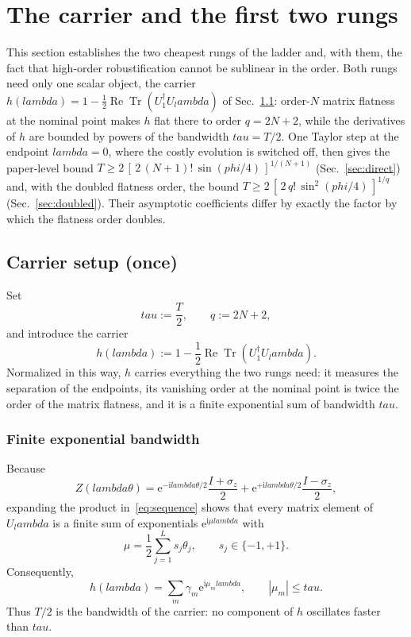 \documentclass[%
  aps,
  pra,
  preprint,
  superscriptaddress,
  amsmath,amssymb,
  nofootinbib,
  floatfix,
]{revtex4-2}
\def\lambda{lambda}\def\tau{tau}\def\phi{phi}\def\alpha{alpha}%
\theoremstyle{definition}
\theoremstyle{remark}
\newcommand{\Tr}{\operatorname{Tr}}
\newcommand{\Ree}{\operatorname{Re}}
\newcommand{\tauvar}{\tau}
\begin{document}
\section{The carrier and the first two rungs}
\label{sec:elementary}

This section establishes the two cheapest rungs of the ladder and, with them, the fact that
high-order robustification cannot be sublinear in the order. Both rungs need only one scalar
object, the carrier $h(\lambda)=1-\tfrac12\Ree\Tr(U_1^\dagger U_\lambda)$ of
Sec.~\ref{sec:carrier}: order-$N$ matrix flatness at the nominal point makes $h$ flat there to
order $q=2N+2$, while the derivatives of $h$ are bounded by powers of the bandwidth
$\tauvar=T/2$. One Taylor step at the endpoint $\lambda=0$, where the costly evolution is
switched off, then gives the paper-level bound
$T\ge2\,[\,2\,(N+1)!\,\sin(\phi/4)\,]^{1/(N+1)}$ (Sec.~\ref{sec:direct}) and, with the
doubled flatness order, the bound $T\ge2\,[\,2\,q!\,\sin^{2}(\phi/4)\,]^{1/q}$
(Sec.~\ref{sec:doubled}). Their asymptotic coefficients differ by exactly the factor by which
the flatness order doubles.

\subsection{Carrier setup (once)}
\label{sec:carrier}

Set
\begin{equation}
\tauvar:=\frac{T}{2},
\qquad q:=2N+2,
\label{eq:tauq}
\end{equation}
and introduce the carrier
\begin{equation}
h(\lambda):=
1-\frac12\Ree\Tr\!(U_1^\dagger U_\lambda).
\label{eq:h}
\end{equation}
Normalized in this way, $h$ carries everything the two rungs need: it measures the separation
of the endpoints, its vanishing order at the nominal point is twice the order of the matrix
flatness, and it is a finite exponential sum of bandwidth $\tauvar$.

\subsubsection{Finite exponential bandwidth}

Because
\[
Z(\lambda\theta)
=\mathrm{e}^{-\mathrm{i}\lambda\theta/2}\frac{I+\sigma_z}{2}
 +\mathrm{e}^{+\mathrm{i}\lambda\theta/2}\frac{I-\sigma_z}{2},
\]
expanding the product in~\eqref{eq:sequence} shows that every matrix element of $U_\lambda$ is a
finite sum of exponentials $\mathrm{e}^{\mathrm{i}\mu\lambda}$ with
\begin{equation}
\mu=\frac12\sum_{j=1}^L s_j\theta_j,
\qquad s_j\in\{-1,+1\}.
\end{equation}
Consequently,
\begin{equation}
h(\lambda)=\sum_m \gamma_m \mathrm{e}^{\mathrm{i}\mu_m\lambda},
\qquad |\mu_m|\le\tauvar.
\label{eq:expsum}
\end{equation}
Thus $T/2$ is the bandwidth of the carrier: no component of $h$ oscillates faster than
$\tauvar$.
\end{document}
